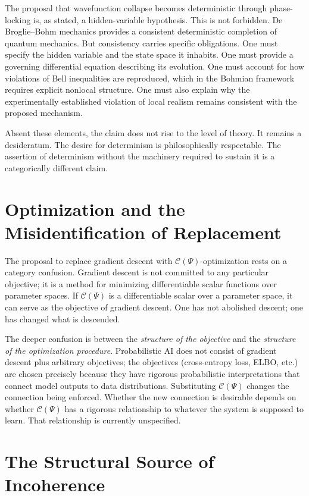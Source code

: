 \documentclass[12pt]{article}
\begin{document}
The proposal that wavefunction collapse becomes deterministic through phase-locking is, as stated, a hidden-variable hypothesis. This is not forbidden. De Broglie–Bohm mechanics provides a consistent deterministic completion of quantum mechanics. But consistency carries specific obligations. One must specify the hidden variable and the state space it inhabits. One must provide a governing differential equation describing its evolution. One must account for how violations of Bell inequalities are reproduced, which in the Bohmian framework requires explicit nonlocal structure. One must also explain why the experimentally established violation of local realism remains consistent with the proposed mechanism.

Absent these elements, the claim does not rise to the level of theory. It remains a desideratum. The desire for determinism is philosophically respectable. The assertion of determinism without the machinery required to sustain it is a categorically different claim.

\section{Optimization and the Misidentification of Replacement}

The proposal to replace gradient descent with $\mathcal{C}(\Psi)$-optimization rests on a category confusion. Gradient descent is not committed to any particular objective; it is a method for minimizing differentiable scalar functions over parameter spaces. If $\mathcal{C}(\Psi)$ is a differentiable scalar over a parameter space, it can serve as the objective of gradient descent. One has not abolished descent; one has changed what is descended.

The deeper confusion is between the \emph{structure of the objective} and the \emph{structure of the optimization procedure}. Probabilistic AI does not consist of gradient descent plus arbitrary objectives; the objectives (cross-entropy loss, ELBO, etc.) are chosen precisely because they have rigorous probabilistic interpretations that connect model outputs to data distributions. Substituting $\mathcal{C}(\Psi)$ changes the connection being enforced. Whether the new connection is desirable depends on whether $\mathcal{C}(\Psi)$ has a rigorous relationship to whatever the system is supposed to learn. That relationship is currently unspecified.

\section{The Structural Source of Incoherence}
\end{document}
